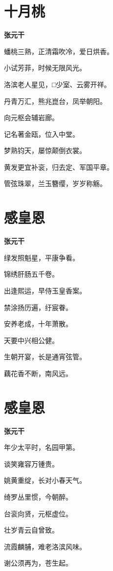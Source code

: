 \documentclass[12pt,a4paper]{ctexbook}
\begin{document}
\section{十月桃}
\textbf{张元干}\par\vspace{0.5em}
蟠桃三熟，正清霜吹冷，爱日烘香。\par
小试芳菲，时候无限风光。\par
洛滨老人星见，□少室、云雾开祥。\par
丹青万汇，熊兆崑台，凤举朝阳。\par
向元枢会辅岩廊。\par
记名著金瓯，位入中堂。\par
梦熟钧天，屡惊颠倒衣裳。\par
黄发更宜补衮，归去定、军国平章。\par
管弦珠翠，兰玉簪缨，岁岁称觞。\par

\section{感皇恩}
\textbf{张元干}\par\vspace{0.5em}
绿发照魁星，平康争看。\par
锦绣肝肠五千卷。\par
出逢熙运，早侍玉皇香案。\par
禁涂扬历遍，纡宸眷。\par
安养老成，十年萧散。\par
天要中兴相公健。\par
生朝开宴，长是通宵弦管。\par
藕花香不断，南风远。\par

\section{感皇恩}
\textbf{张元干}\par\vspace{0.5em}
年少太平时，名园甲第。\par
谈笑雍容万锺贵。\par
姚黄重绽，长对小春天气。\par
绮罗丛里惯，今朝醉。\par
台衮向贤，元枢虚位。\par
壮岁青云自曾致。\par
流霞麟脯，难老洛滨风味。\par
谢公须再为，苍生起。\par
\end{document}
